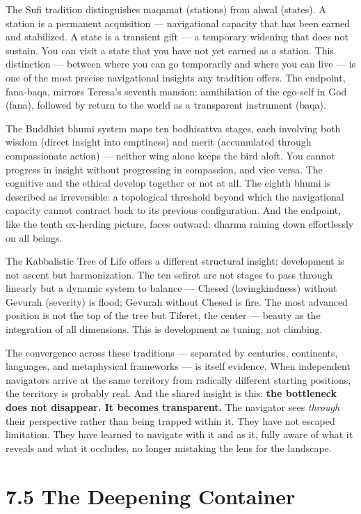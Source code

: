 The Sufi tradition distinguishes maqamat (stations) from ahwal (states). A station is a permanent acquisition — navigational capacity that has been earned and stabilized. A state is a transient gift — a temporary widening that does not sustain. You can visit a state that you have not yet earned as a station. This distinction — between where you can go temporarily and where you can live — is one of the most precise navigational insights any tradition offers. The endpoint, fana-baqa, mirrors Teresa's seventh mansion: annihilation of the ego-self in God (fana), followed by return to the world as a transparent instrument (baqa).


The Buddhist bhumi system maps ten bodhisattva stages, each involving both wisdom (direct insight into emptiness) and merit (accumulated through compassionate action) — neither wing alone keeps the bird aloft. You cannot progress in insight without progressing in compassion, and vice versa. The cognitive and the ethical develop together or not at all. The eighth bhumi is described as irreversible: a topological threshold beyond which the navigational capacity cannot contract back to its previous configuration. And the endpoint, like the tenth ox-herding picture, faces outward: dharma raining down effortlessly on all beings.


The Kabbalistic Tree of Life offers a different structural insight: development is not ascent but harmonization. The ten sefirot are not stages to pass through linearly but a dynamic system to balance — Chesed (lovingkindness) without Gevurah (severity) is flood; Gevurah without Chesed is fire. The most advanced position is not the top of the tree but Tiferet, the center — beauty as the integration of all dimensions. This is development as tuning, not climbing.


The convergence across these traditions — separated by centuries, continents, languages, and metaphysical frameworks — is itself evidence. When independent navigators arrive at the same territory from radically different starting positions, the territory is probably real. And the shared insight is this: \textbf{the bottleneck does not disappear. It becomes transparent.} The navigator sees \textit{through} their perspective rather than being trapped within it. They have not escaped limitation. They have learned to navigate with it and as it, fully aware of what it reveals and what it occludes, no longer mistaking the lens for the landscape.


\section*{7.5 The Deepening Container}


